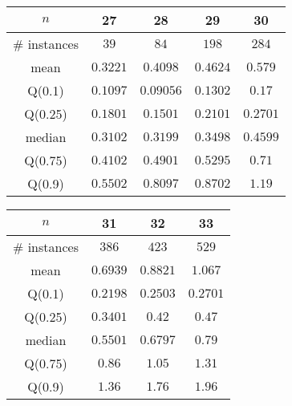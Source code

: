 \begin{tabular}{c|cccc} 
\hline 
$n$ & 27 & 28 & 29 & 30 \tabularnewline 
\hline 
\hline 
\# instances & $39$ & $84$ & $198$ & $284$ \tabularnewline 
mean & $0.3221$ & $0.4098$ & $0.4624$ & $0.579$ \tabularnewline 
Q(0.1) & $0.1097$ & $0.09056$ & $0.1302$ & $0.17$ \tabularnewline 
Q(0.25) & $0.1801$ & $0.1501$ & $0.2101$ & $0.2701$ \tabularnewline 
median & $0.3102$ & $0.3199$ & $0.3498$ & $0.4599$ \tabularnewline 
Q(0.75) & $0.4102$ & $0.4901$ & $0.5295$ & $0.71$ \tabularnewline 
Q(0.9) & $0.5502$ & $0.8097$ & $0.8702$ & $1.19$ \tabularnewline 
\hline 
\end{tabular} 
\medskip{} 

\begin{tabular}{c|ccc} 
\hline 
$n$ & 31 & 32 & 33 \tabularnewline 
\hline 
\hline 
\# instances & $386$ & $423$ & $529$ \tabularnewline 
mean & $0.6939$ & $0.8821$ & $1.067$ \tabularnewline 
Q(0.1) & $0.2198$ & $0.2503$ & $0.2701$ \tabularnewline 
Q(0.25) & $0.3401$ & $0.42$ & $0.47$ \tabularnewline 
median & $0.5501$ & $0.6797$ & $0.79$ \tabularnewline 
Q(0.75) & $0.86$ & $1.05$ & $1.31$ \tabularnewline 
Q(0.9) & $1.36$ & $1.76$ & $1.96$ \tabularnewline 
\hline 
\end{tabular} 
\medskip{} 


